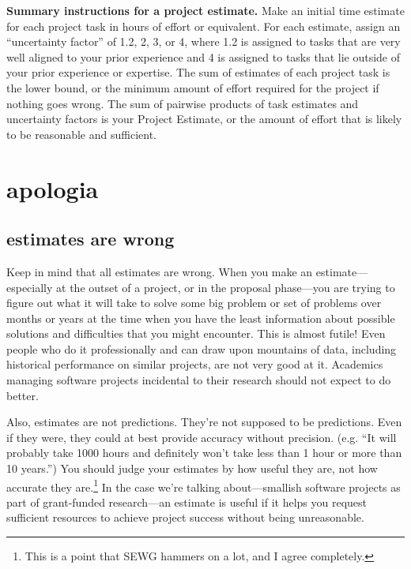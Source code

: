 \documentclass[12pt,oneside]{book}
\begin{document}
\hfill
\begin{mdframed}[everyline=true]
\textbf{Summary instructions for a project estimate.} Make an initial time estimate for each project task in hours of effort or equivalent. For each estimate, assign an ``uncertainty factor'' of 1.2, 2, 3, or 4, where 1.2 is assigned to tasks that are very well aligned to your prior experience and 4 is assigned to tasks that lie outside of your prior experience or expertise. The sum of estimates of each project task is the lower bound, or the minimum amount of effort required for the project if nothing goes wrong. The sum of pairwise products of task estimates and uncertainty factors is your Project Estimate, or the amount of effort that is likely to be reasonable and sufficient.
\end{mdframed}

\newpage
{}
\chapter*{apologia}
\label{scrivauto:43}

\section*{estimates are wrong}
\label{scrivauto:44}

Keep in mind that all estimates are wrong. When you make an estimate---especially at the outset of a project, or in the proposal phase---you are trying to figure out what it will take to solve some big problem or set of problems over months or years at the time when you have the least information about possible solutions and difficulties that you might encounter. This is almost futile! Even people who do it professionally and can draw upon mountains of data, including historical performance on similar projects, are not very good at it. Academics managing software projects incidental to their research should not expect to do better.

Also, estimates are not predictions. They're not supposed to be predictions. Even if they were, they could at best provide accuracy without precision. (e.g. ``It will probably take 1000 hours and definitely won't take less than 1 hour or more than 10 years.'') You should judge your estimates by how useful they are, not how accurate they are.\footnote{This is a point that SEWG hammers on a lot, and I agree completely.} In the case we're talking about---smallish software projects as part of grant-funded research---an estimate is useful if it helps you request sufficient resources to achieve project success without being unreasonable.
\end{document}
